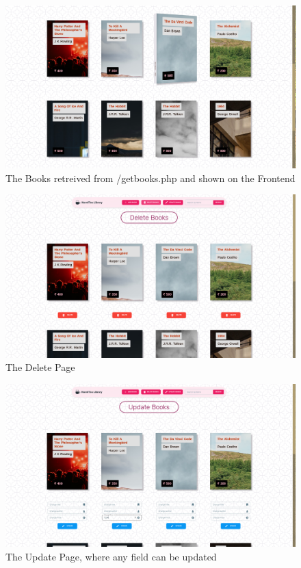 \documentclass[11pt]{article}
\begin{document}
\begin{figure}[H]
    \centering
    \includegraphics[width=.95\textwidth]{screenshots/books.png}
    \caption{The Books retreived from /getbooks.php and shown on the Frontend}
\end{figure}

\begin{figure}[H]
    \centering
    \includegraphics[width=.95\textwidth]{screenshots/delete.png}
    \caption{The Delete Page}
\end{figure}
\begin{figure}[H]

    \centering
    \includegraphics[width=.95\textwidth]{screenshots/update.png}
    \caption{The Update Page, where any field can be updated}
\end{figure}
\end{document}

